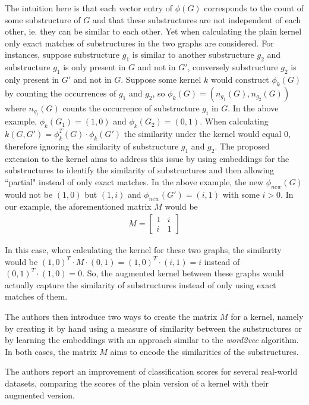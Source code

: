 The intuition here is that each vector entry of $\phi(G)$ corresponds to the count of some substructure of $G$ and that these substructures are not independent of each other, ie. they can be similar to each other.
Yet when calculating the plain kernel only exact matches of substructures in the two graphs are considered.
For instances, suppose substructure $g_1$ is similar to another substructure $g_2$ and substructure $g_1$ is only present in $G$ and not in $G'$, conversely substructure $g_2$ is only present in $G'$ and not in $G$.
Suppose some kernel $k$ would construct $\phi_k(G)$ by counting the occurrences of $g_1$ and $g_2$, so $\phi_k(G) = (n_{g_1}(G), n_{g_2}(G))$ where $n_{g_i}(G)$ counts the occurrence of substructure $g_i$ in $G$.
In the above example, $\phi_k(G_1) = (1, 0)$ and $\phi_k(G_2) = (0, 1)$. When calculating $k(G, G') = \phi_k^T(G) \cdot \phi_k(G') $ the similarity under the kernel would equal 0, therefore ignoring the similarity of substructure $g_1$ and $g_2$.
The proposed extension to the kernel aims to address this issue by using embeddings for the substructures to identify the similarity of substructures and then allowing ``partial" instead of only exact matches.
In the above example, the new $\phi_{new}(G)$ would not be $(1, 0)$ but $(1, i)$ and $\phi_{new}(G') = (i, 1)$ with some $i > 0$.
In our example, the aforementioned matrix $M$ would be
\begin{align*}
M = \begin{bmatrix}
1 & i \\
i & 1
\end{bmatrix}
\end{align*}

In this case, when calculating the kernel for these two graphs, the similarity would be $(1, 0)^T \cdot M \cdot (0, 1) = (1, 0)^T \cdot (i, 1) = i$ instead of $(0, 1)^T \cdot (1, 0) = 0$.
So, the augmented kernel between these graphs would actually capture the similarity of substructures instead of only using exact matches of them.

The authors then introduce two ways to create the matrix $M$ for a kernel, namely by creating it by hand using a measure of similarity between the substructures or by learning the embeddings with an approach similar to the \textit{word2vec} algorithm.
In both cases, the matrix $M$ aims to encode the similarities of the substructures.

The authors report an improvement of classification scores for several real-world datasets, comparing the scores of the plain version of a kernel with their augmented version.


